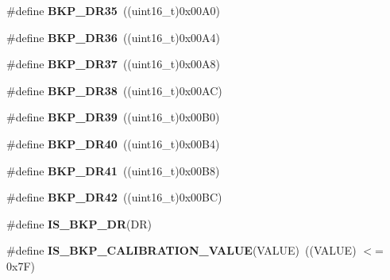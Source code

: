 \begin{DoxyCompactItemize}
\item 
\hypertarget{group__Data__Backup__Register_ga54e494fd651d2e1970ab7e5d6528af21}{
\#define {\bfseries BKP\_\-DR35}~((uint16\_\-t)0x00A0)}
\label{group__Data__Backup__Register_ga54e494fd651d2e1970ab7e5d6528af21}

\item 
\hypertarget{group__Data__Backup__Register_ga212028eb8d981756b3bc78492434d19a}{
\#define {\bfseries BKP\_\-DR36}~((uint16\_\-t)0x00A4)}
\label{group__Data__Backup__Register_ga212028eb8d981756b3bc78492434d19a}

\item 
\hypertarget{group__Data__Backup__Register_ga6c11b636a33c5b352d267355e502b34d}{
\#define {\bfseries BKP\_\-DR37}~((uint16\_\-t)0x00A8)}
\label{group__Data__Backup__Register_ga6c11b636a33c5b352d267355e502b34d}

\item 
\hypertarget{group__Data__Backup__Register_ga88f4c7dd39ba83b66159b2c808275a09}{
\#define {\bfseries BKP\_\-DR38}~((uint16\_\-t)0x00AC)}
\label{group__Data__Backup__Register_ga88f4c7dd39ba83b66159b2c808275a09}

\item 
\hypertarget{group__Data__Backup__Register_ga1656f56588b474b1f48bb96380cdfd4a}{
\#define {\bfseries BKP\_\-DR39}~((uint16\_\-t)0x00B0)}
\label{group__Data__Backup__Register_ga1656f56588b474b1f48bb96380cdfd4a}

\item 
\hypertarget{group__Data__Backup__Register_ga17e0d382ac43abed1663846b5aecc09a}{
\#define {\bfseries BKP\_\-DR40}~((uint16\_\-t)0x00B4)}
\label{group__Data__Backup__Register_ga17e0d382ac43abed1663846b5aecc09a}

\item 
\hypertarget{group__Data__Backup__Register_gae1e184afc030987396716ddfad008e81}{
\#define {\bfseries BKP\_\-DR41}~((uint16\_\-t)0x00B8)}
\label{group__Data__Backup__Register_gae1e184afc030987396716ddfad008e81}

\item 
\hypertarget{group__Data__Backup__Register_ga557d35e490957616b02672005f516542}{
\#define {\bfseries BKP\_\-DR42}~((uint16\_\-t)0x00BC)}
\label{group__Data__Backup__Register_ga557d35e490957616b02672005f516542}

\item 
\#define {\bfseries IS\_\-BKP\_\-DR}(DR)
\item 
\hypertarget{group__Data__Backup__Register_gafc3386eaa5383b64e9d706e5fe8dc1cf}{
\#define {\bfseries IS\_\-BKP\_\-CALIBRATION\_\-VALUE}(VALUE)~((VALUE) $<$= 0x7F)}
\label{group__Data__Backup__Register_gafc3386eaa5383b64e9d706e5fe8dc1cf}

\end{DoxyCompactItemize}


